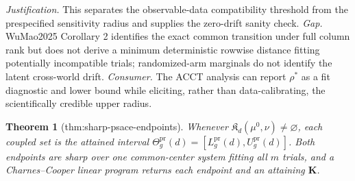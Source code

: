 \documentclass{article}
\newtheorem{theorem}{Theorem}
\begin{document}
\par\smallskip\noindent \textit{Justification.} This separates the observable-data compatibility threshold from the prespecified sensitivity radius and supplies the zero-drift sanity check. \textit{Gap.} WuMao2025 Corollary 2 identifies the exact common transition under full column rank but does not derive a minimum deterministic rowwise distance fitting potentially incompatible trials; randomized-arm marginals do not identify the latent cross-world drift. \textit{Consumer.} The ACCT analysis can report \(\rho^*\) as a fit diagnostic and lower bound while eliciting, rather than data-calibrating, the scientifically credible upper radius.

\begin{theorem}[thm:sharp-psace-endpoints]\label{thm:sharp-psace-endpoints}
Whenever \(\mathfrak K_d(\mu^0,\nu)\neq\varnothing\), each coupled set is the attained interval \(\Theta_g^{\mathrm{pr}}(d)=[L_g^{\mathrm{pr}}(d),U_g^{\mathrm{pr}}(d)]\). Both endpoints are sharp over one common-center system fitting all \(m\) trials, and a Charnes--Cooper linear program returns each endpoint and an attaining \(\mathbf K\).
\end{theorem}
\end{document}
